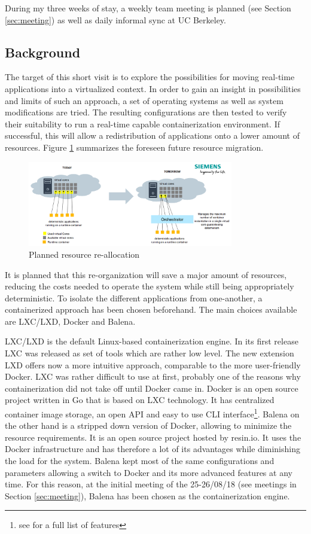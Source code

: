 \documentclass[]{scrartcl}
\begin{document}
During my three weeks of stay, a weekly team meeting is planned (see Section \ref{sec:meeting}) as well as daily informal sync at UC Berkeley.

\subsection{Background}

The target of this short visit is to explore the possibilities for moving real-time applications into a virtualized context. In order to gain an insight in possibilities and limits of such an approach, a set of operating systems as well as system modifications are tried.
The resulting configurations are then tested to verify their suitability to run a real-time capable containerization environment. If successful, this will allow a redistribution of applications onto a lower amount of resources. 
Figure \ref{fig:plan} summarizes the foreseen future resource migration. %

\begin{figure}
	\centering
	\includegraphics[width=0.8\textwidth]{plan}
	\caption{Planned resource re-allocation}
	\label{fig:plan}
\end{figure}

It is planned that this re-organization will save a major amount of resources, reducing the costs needed to operate the system while still being appropriately deterministic. To isolate the different applications from one-another, a containerized approach has been chosen beforehand. The main choices available are LXC/LXD, Docker and Balena.

LXC/LXD is the default Linux-based containerization engine. In its first release LXC was released as set of tools which are rather low level. The new extension LXD offers now a more intuitive approach, comparable to the more user-friendly Docker. LXC was rather difficult to use at first, probably one of the reasons why containerization did not take off until Docker came in. Docker is an open source project written in Go that is based on LXC technology. It has centralized container image storage, an open API and easy to use CLI interface\footnote{see \cite{docker01} for a full list of features}. Balena on the other hand is a stripped down version of Docker, allowing to minimize the resource requirements. It is an open source project hosted by resin.io. It uses the Docker infrastructure and has therefore a lot of its advantages while diminishing the load for the system. Balena kept most of the same configurations and parameters allowing a switch to Docker and its more advanced features at any time. For this reason, at the initial meeting of the 25-26/08/18 (see meetings in Section \ref{sec:meeting}), Balena has been chosen as the containerization engine. 
\end{document}
